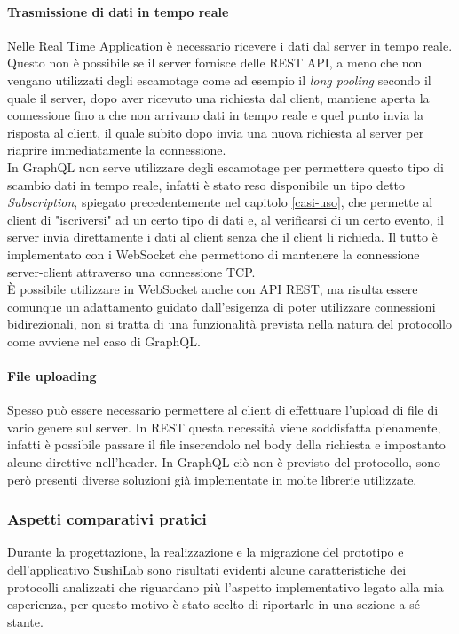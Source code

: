 \paragraph{Trasmissione di dati in tempo reale}
Nelle Real Time Application è necessario ricevere i dati dal server in tempo reale. Questo non è possibile se il server fornisce delle REST API, a meno che non vengano utilizzati degli escamotage come ad esempio il \textit{long pooling} secondo il quale il server, dopo aver ricevuto una richiesta dal client, mantiene aperta la connessione fino a che non arrivano dati in tempo reale e quel punto invia la risposta al client, il quale subito dopo invia una nuova richiesta al server per riaprire immediatamente la connessione.\\
In GraphQL non serve utilizzare degli escamotage per permettere questo tipo di scambio dati in tempo reale, infatti è stato reso disponibile un tipo detto \textit{Subscription}, spiegato precedentemente nel capitolo \ref{casi-uso}, che permette al client di "iscriversi" ad un certo tipo di dati e, al verificarsi di un certo evento, il server invia direttamente i dati al client senza che il client li richieda. Il tutto è implementato con i WebSocket che permettono di mantenere la connessione server-client attraverso una connessione TCP. \\
È possibile utilizzare in WebSocket anche con API REST, ma risulta essere comunque un adattamento guidato dall'esigenza di poter utilizzare connessioni bidirezionali, non si tratta di una funzionalità prevista nella natura del protocollo come avviene nel caso di GraphQL.
\paragraph{File uploading}
Spesso può essere necessario permettere al client di effettuare l'upload di file di vario genere sul server. In REST questa necessità viene soddisfatta pienamente, infatti è possibile passare il file inserendolo nel body della richiesta e impostanto alcune direttive nell'header. In GraphQL ciò non è previsto del protocollo, sono però presenti diverse soluzioni già implementate in molte librerie utilizzate.
\subsubsection{Aspetti comparativi pratici}
Durante la progettazione, la realizzazione e la migrazione del prototipo e dell'applicativo SushiLab sono risultati evidenti alcune caratteristiche dei protocolli analizzati che riguardano più l'aspetto implementativo legato alla mia esperienza, per questo motivo è stato scelto di riportarle in una sezione a sé stante.
